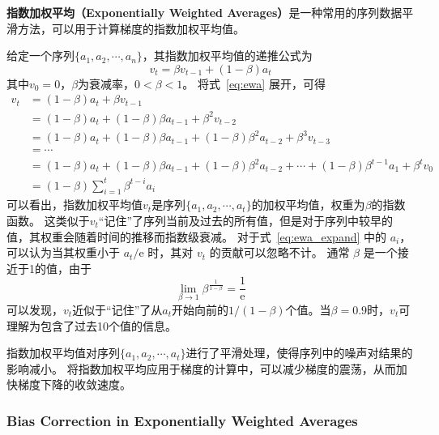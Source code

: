 \textbf{指数加权平均（Exponentially Weighted Averages）}是一种常用的序列数据平滑方法，可以用于计算梯度的指数加权平均值。

给定一个序列$\{a_1, a_2, \cdots, a_n\}$，其指数加权平均值的递推公式为
\begin{equation}
    v_t = \beta v_{t-1} + (1 - \beta)a_t
    \label{eq:ewa}
\end{equation}
其中$v_0 = 0$，$\beta$为衰减率，$0 < \beta < 1$。
将式~\eqref{eq:ewa} 展开，可得
\begin{equation}
    \begin{aligned}
        v_t &= (1 - \beta)a_t + \beta v_{t-1} \\
            &= (1 - \beta)a_t + (1 - \beta)\beta a_{t-1} + \beta^2 v_{t-2} \\
            &= (1 - \beta)a_t + (1 - \beta)\beta a_{t-1} + (1 - \beta)\beta^2 a_{t-2} + \beta^3 v_{t-3} \\
            &= \cdots \\
            &= (1 - \beta)a_t + (1 - \beta)\beta a_{t-1} + (1 - \beta)\beta^2 a_{t-2} + \cdots + (1 - \beta)\beta^{t-1}a_1 + \beta^t v_0 \\
            &= (1 - \beta)\sum_{i=1}^t\beta^{t-i}a_i
    \end{aligned}
    \label{eq:ewa_expand}
\end{equation}
可以看出，指数加权平均值$v_t$是序列$\{a_1, a_2, \cdots, a_t\}$的加权平均值，权重为$\beta$的指数函数。
这类似于$v_t$“记住”了序列当前及过去的所有值，但是对于序列中较早的值，其权重会随着时间的推移而指数级衰减。
对于式~\eqref{eq:ewa_expand} 中的 $a_i$，可以认为当其权重小于 $a_t/\mathrm{e}$ 时，其对 $v_t$ 的贡献可以忽略不计。
通常 $\beta$ 是一个接近于1的值，由于
\begin{equation}
    \lim_{\beta \to 1}  \beta^{\frac{\scriptstyle 1}{\scriptstyle 1-\beta}} = \frac{1}{\mathrm{e}}
\end{equation}
可以发现，$v_t$近似于“记住”了从$a_t$开始向前的$1/(1-\beta)$个值。当$\beta=0.9$时，$v_t$可理解为包含了过去10个值的信息。

指数加权平均值对序列$\{a_1, a_2, \cdots, a_t\}$进行了平滑处理，使得序列中的噪声对结果的影响减小。
将指数加权平均应用于梯度的计算中，可以减少梯度的震荡，从而加快梯度下降的收敛速度。

\subsubsection{Bias Correction in Exponentially Weighted Averages}

